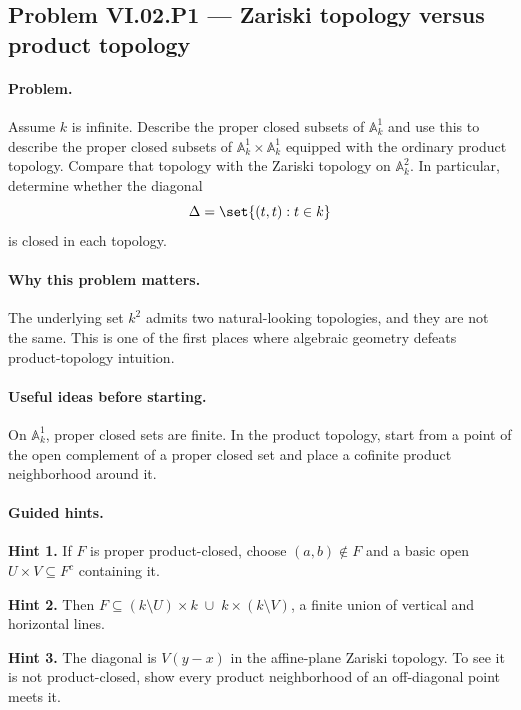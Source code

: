 \subsection*{Problem VI.02.P1 --- Zariski topology versus product topology}
\label{prob:vi02-p1}

\paragraph{Problem.}
Assume \(k\) is infinite.  Describe the proper closed subsets of \(\mathbb A_k^1\) and use
this to describe the proper closed subsets of
\(\mathbb A_k^1\times\mathbb A_k^1\) equipped with the ordinary product topology.  Compare
that topology with the Zariski topology on \(\mathbb A_k^2\).  In particular, determine
whether the diagonal
\[
\Delta=\set{(t,t):t\in k}
\]
is closed in each topology.

\ifdefined\FullProblemDossiers
\paragraph{Why this problem matters.}
The underlying set \(k^2\) admits two natural-looking topologies, and they are not the same.
This is one of the first places where algebraic geometry defeats product-topology intuition.

\paragraph{Useful ideas before starting.}
On \(\mathbb A_k^1\), proper closed sets are finite.  In the product topology, start from a
point of the open complement of a proper closed set and place a cofinite product neighborhood
around it.

\paragraph{Guided hints.}
\textbf{Hint 1.} If \(F\) is proper product-closed, choose \((a,b)\notin F\) and a basic open
\(U\times V\subseteq F^c\) containing it.

\textbf{Hint 2.} Then \(F\subseteq (k\setminus U)\times k\;\cup\;k\times(k\setminus V)\), a
finite union of vertical and horizontal lines.

\textbf{Hint 3.} The diagonal is \(V(y-x)\) in the affine-plane Zariski topology.  To see it
is not product-closed, show every product neighborhood of an off-diagonal point meets it.

